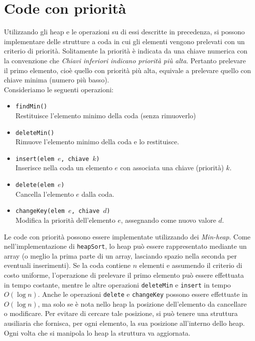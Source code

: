 \section{Code con priorità}
Utilizzando gli heap e le operazioni su di essi descritte in precedenza, si possono
implementare delle strutture a coda in cui gli elementi vengono prelevati con un criterio di priorità. 
Solitamente la priorità è indicata da una chiave numerica con la convenzione
che \emph{Chiavi inferiori indicano priorità più alta}. Pertanto prelevare il primo elemento, cioè quello
con priorità più alta, equivale a prelevare quello con chiave minima (numero più basso).\\
Consideriamo le seguenti operazioni:
\begin{itemize}
    \item \texttt{findMin()}\\
    Restituisce l'elemento minimo della coda (senza rimuoverlo)
    \item \texttt{deleteMin()}\\
    Rimuove l'elemento minimo della coda e lo restituisce.
    \item \texttt{insert(elem $e$, chiave $k$)}\\
    Inserisce nella coda un elemento $e$ con associata una chiave (priorità) $k$.
    \item \texttt{delete(elem $e$)}\\
    Cancella l'elemento $e$ dalla coda.
    \item \texttt{changeKey(elem $e$, chiave $d$)}\\
    Modifica la priorità dell'elemento $e$, assegnando come nuovo valore $d$.
\end{itemize}

\noindent Le code con priorità possono essere implementate utilizzando dei \emph{Min-heap}. Come nell'implementazione
di \texttt{heapSort}, lo heap può essere rappresentato mediante un array (o meglio la prima parte 
di un array, lasciando spazio nella seconda per eventuali inserimenti).
Se la coda contiene $n$ elementi e assumendo il criterio di costo uniforme, 
l'operazione di prelevare il primo elemento può essere effettuata in tempo costante,
mentre le altre operazioni \texttt{deleteMin} e \texttt{insert} in tempo $O(\log n)$.
Anche le operazioni \texttt{delete} e \texttt{changeKey} possono essere effettuate in
$O(\log n)$, ma solo se è nota nello heap la posizione dell'elemento da cancellare o modificare.
Per evitare di cercare tale posizione, si può tenere una struttura ausiliaria che fornisca,
per ogni elemento, la sua posizione all'interno dello heap. Ogni volta che si
manipola lo heap la struttura va aggiornata.
\clearpage